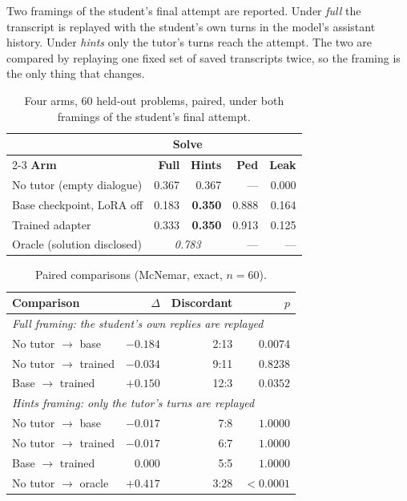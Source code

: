 Two framings of the student's final attempt are reported. Under \emph{full} the
transcript is replayed with the student's own turns in the model's assistant
history. Under \emph{hints} only the tutor's turns reach the attempt. The two
are compared by replaying one fixed set of saved transcripts twice, so the
framing is the only thing that changes.

\begin{table}[t]
\caption{Four arms, 60 held-out problems, paired, under both framings of the
student's final attempt.}
\label{tab:threearm}
\centering
\small
\begin{tabular}{lrrrr}
\toprule
 & \multicolumn{2}{c}{\textbf{Solve}} & & \\
\cmidrule(lr){2-3}
\textbf{Arm} & \textbf{Full} & \textbf{Hints} & \textbf{Ped} & \textbf{Leak} \\
\midrule
No tutor (empty dialogue)   & 0.367 & 0.367 & ---   & 0.000 \\
Base checkpoint, LoRA off   & 0.183 & \textbf{0.350} & 0.888 & 0.164 \\
Trained adapter             & 0.333 & \textbf{0.350} & 0.913 & 0.125 \\
Oracle (solution disclosed) & \multicolumn{2}{c}{\textit{0.783}} & --- & --- \\
\bottomrule
\end{tabular}
\end{table}

\begin{table}[t]
\caption{Paired comparisons (McNemar, exact, $n{=}60$).}
\label{tab:mcnemar}
\centering
\small
\begin{tabular}{lrrr}
\toprule
\textbf{Comparison} & \textbf{$\Delta$} & \textbf{Discordant} & \textbf{$p$} \\
\midrule
\multicolumn{4}{l}{\emph{Full framing: the student's own replies are replayed}} \\
No tutor $\rightarrow$ base     & $-0.184$ & 2:13  & $\mathbf{0.0074}$ \\
No tutor $\rightarrow$ trained  & $-0.034$ & 9:11  & $0.8238$ \\
Base $\rightarrow$ trained      & $+0.150$ & 12:3  & $\mathbf{0.0352}$ \\
\midrule
\multicolumn{4}{l}{\emph{Hints framing: only the tutor's turns are replayed}} \\
No tutor $\rightarrow$ base     & $-0.017$ & 7:8   & $1.0000$ \\
No tutor $\rightarrow$ trained  & $-0.017$ & 6:7   & $1.0000$ \\
Base $\rightarrow$ trained      & $0.000$  & 5:5   & $1.0000$ \\
\midrule
No tutor $\rightarrow$ oracle   & $+0.417$ & 3:28  & $\mathbf{<0.0001}$ \\
\bottomrule
\end{tabular}
\end{table}

